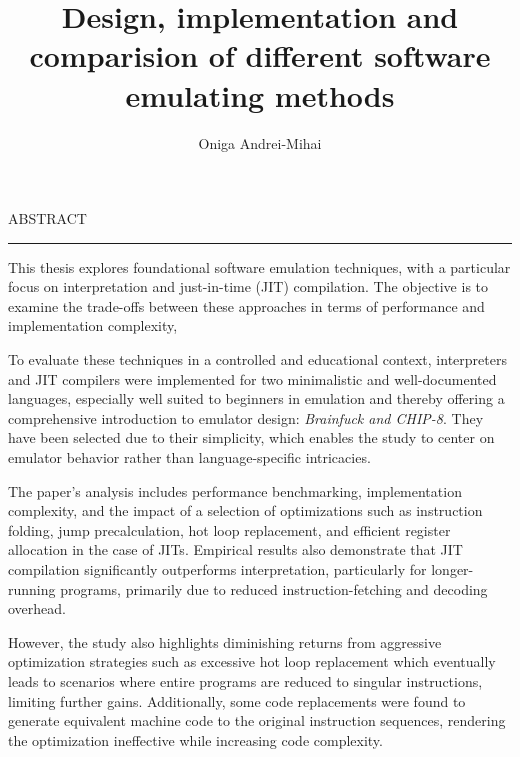 \documentclass[12pt]{scrreport}
\begin{document}
\title{Design, implementation and comparision of different software emulating methods}					   
\author{Oniga Andrei-Mihai}											
				
\maketitle

\newpage
\thispagestyle{empty}
\mbox{}
\newpage
{}

\cleardoublepage
ABSTRACT
\vspace{0.5cm}	
\hrule
\vspace{0.5cm}

\par This thesis explores foundational software emulation techniques, with a particular focus on interpretation and just-in-time (JIT) compilation. The objective is to examine the trade-offs between these approaches in terms of performance and implementation complexity, 

\par To evaluate these techniques in a controlled and educational context, interpreters and JIT compilers were implemented for two minimalistic and well-documented languages, especially well suited to beginners in emulation and thereby offering a comprehensive introduction to emulator design: \textit{Brainfuck and CHIP-8}. They have been selected due to their simplicity, which enables the study to center on emulator behavior rather than language-specific intricacies.

\par The paper's analysis includes performance benchmarking, implementation complexity, and the impact of a selection of optimizations such as instruction folding, jump precalculation, hot loop replacement, and efficient register allocation in the case of JITs. Empirical results also demonstrate that JIT compilation significantly outperforms interpretation, particularly for longer-running programs, primarily due to reduced instruction-fetching and decoding overhead.

\par However, the study also highlights diminishing returns from aggressive optimization strategies such as excessive hot loop replacement which eventually leads to scenarios where entire programs are reduced to singular instructions, limiting further gains. Additionally, some code replacements were found to generate equivalent machine code to the original instruction sequences, rendering the optimization ineffective while increasing code complexity.
\end{document}
